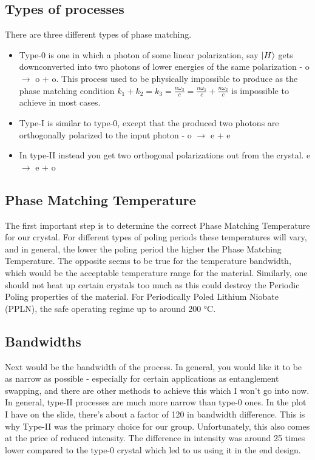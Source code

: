 \documentclass{article}
\begin{document}
\subsection{Types of processes}
There are three different types of phase matching.
\begin{itemize}
	\item Type-0 is one in which a photon of some linear polarization, say $\ket{H}$ gets downconverted
into two photons of lower energies of the same polarization - o $\rightarrow$ o + o. This process used to be physically impossible to produce 
as the phase matching condition $k_1 + k_2 = k_3 = \frac{n \omega_3}{c} = \frac{n \omega_1}{c} + \frac{n \omega_2}{c}$ is impossible to achieve
in most cases.
	\item Type-I is similar to type-0, except that the produced two photons are orthogonally polarized to the input photon - o $\rightarrow$ e + e
	\item In type-II instead you get two orthogonal polarizations out from the crystal. e $\rightarrow$ e + o
\end{itemize}

\subsection{Phase Matching Temperature}
The first important step is to determine the correct Phase Matching Temperature for our crystal. For different types of poling
periods these temperatures will vary, and in general, the lower the poling period the higher the Phase Matching Temperature.
The opposite seems to be true for the temperature bandwidth, which would be the acceptable temperature range for the material.
Similarly, one should not heat up certain crystals too much as this could destroy the Periodic Poling properties of the material.
For Periodically Poled Lithium Niobate (PPLN), the safe operating regime up to around 200 °C.

\subsection{Bandwidths}
Next would be the bandwidth of the process. In general, you would like it to be as narrow as possible - especially for certain
applications as entanglement swapping, and there are other methods to achieve this which I won't go into now. In general,
type-II processes are much more narrow than type-0 ones. In the plot I have on the slide, there's about a factor of 120 in 
bandwidth difference. This is why Type-II was the primary choice for our group. Unfortunately, this also comes at the price 
of reduced intensity. The difference in intensity was around 25 times lower compared to the type-0 crystal which led to us
using it in the end design.
\end{document}
